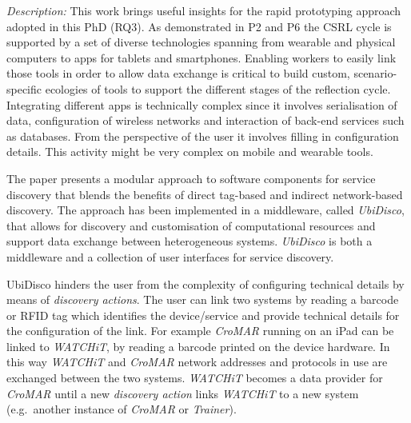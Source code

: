 \emph{Description:} This work brings useful insights for the rapid prototyping approach adopted in this PhD (RQ3). As demonstrated in P2 and P6 the CSRL cycle is supported by a set of diverse technologies spanning from wearable and physical computers to apps for tablets and smartphones. Enabling workers to easily link those tools in order to allow data exchange is critical to build custom, scenario-specific ecologies of tools to support the different stages of the reflection cycle. Integrating different apps is technically complex since it involves serialisation of data, configuration of wireless networks and interaction of back-end services such as databases. From the perspective of the user it involves filling in configuration details. This activity might be very complex on mobile and wearable tools.

The paper presents a modular approach to software components for service discovery that blends the benefits of direct tag-based and indirect network-based discovery. The approach has been implemented in a middleware, called \emph{UbiDisco}, that allows for discovery and customisation of computational resources and support data exchange between heterogeneous systems. \emph{UbiDisco} is both a middleware and a collection of user interfaces for service discovery.

UbiDisco hinders the user from the complexity of configuring technical details by means of \emph{discovery actions}. The user can link two systems by reading a barcode or RFID tag which identifies the device/service and provide technical details for the configuration of the link. For example \emph{CroMAR} running on an iPad can be linked to \emph{WATCHiT}, by reading a barcode printed on the device hardware. In this way \emph{WATCHiT} and \emph{CroMAR} network addresses and protocols in use are exchanged between the two systems. \emph{WATCHiT} becomes a data provider for \emph{CroMAR} until a new \emph{discovery action} links \emph{WATCHiT} to a new system (e.g.~another instance of \emph{CroMAR} or \emph{Trainer}).

